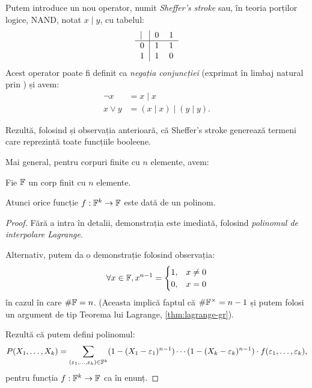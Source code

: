 Putem introduce un nou operator, numit \emph{Sheffer's stroke}\footnotemark
sau, în teoria porților logice, NAND, notat $ x \mid y $, cu tabelul:
\[
  \begin{tabular}{l|ll}
    $\mid$ & 0 & 1 \\
    \hline
    0 & 1 & 1 \\
    1 & 1 & 0
  \end{tabular}
\]
Acest operator poate fi definit ca \emph{negația conjuncției} (exprimat în limbaj
natural prin ) și avem:
\begin{align*}
  \lnot x &= x \mid x \\
  x \lor y &= (x \mid x) \mid (y \mid y).
\end{align*}

Rezultă, folosind și observația anterioară, că Sheffer's stroke generează termeni
care reprezintă toate funcțiile booleene.

Mai general, pentru corpuri finite cu $ n $ elemente, avem:
\begin{theorem}\label{thm:fn-functie}
  Fie $ \mathbb{F} $ un corp finit cu $ n $ elemente.

  Atunci orice funcție $ f : \mathbb{F}^k \to \mathbb{F} $ este dată de un polinom.
\end{theorem}

\begin{proof}
  Fără a intra în detalii, demonstrația este imediată, folosind
  \emph{polinomul de interpolare Lagrange}.\footnotemark

  Alternativ, putem da o demonstrație folosind observația:
  \[
    \forall x \in \mathbb{F}, x^{n-1} =
    \begin{cases}
      1, & x \neq 0 \\
      0, & x = 0
    \end{cases}
  \]
  în cazul în care $ \# \mathbb{F} = n $. (Aceasta implică faptul că $ \# \mathbb{F}^\times = n - 1 $
  și putem folosi un argument de tip Teorema lui Lagrange, \ref{thm:lagrange-gr}).

  Rezultă că putem defini polinomul:
  \[
    P(X_1, \dots, X_k) = \sum_{(\varepsilon_1, \dots, \varepsilon_k) \in \FF^k} %
    (1 - (X_1 - \varepsilon_1)^{n-1}) \cdots (1 - (X_k - \varepsilon_k)^{n-1}) \cdot %
    f(\varepsilon_1, \dots, \varepsilon_k),
  \]
  pentru funcția $ f : \mathbb{F}^k \to \mathbb{F} $ ca în enunț.
\end{proof}

